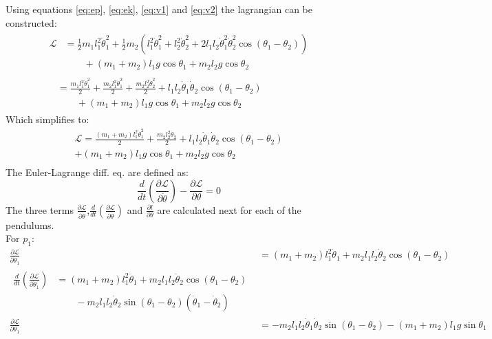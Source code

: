 Using equations \ref{eq:ep}, \ref{eq:ek}, \ref{eq:v1} and \ref{eq:v2} the lagrangian can be constructed:
\begin{align}
	\begin{split}
		\mathcal{L}&=\frac{1}{2}m_1l_1^2\dot\theta_1^2+\frac{1}{2}m_2\left(l_1^2\dot\theta_1^2+l_2^2\dot\theta_2^2+2l_1l_2\dot\theta_1^2\dot\theta_2^2\cos{(\theta_1-\theta_2)}\right)\\
		&\qquad+(m_1+m_2)l_1g\cos{\theta_1}+m_2l_2g\cos{\theta_2}
	\end{split}\\
	\begin{split}
		&=\frac{m_1l_1^2\dot\theta_1^2}{2}+\frac{m_2l_1^2\dot\theta_1^2}{2}+\frac{m_2l_2^2\dot\theta_2^2}{2}+l_1l_2\dot\theta_1\dot\theta_2\cos{(\theta_1-\theta_2)}\\
		&\qquad+(m_1+m_2)l_1g\cos{\theta_1}+m_2l_2g\cos{\theta_2}
	\end{split}
\end{align}
Which simplifies to:
\begin{equation}
	\label{eq:lagrangian}
	\begin{split}
		\mathcal{L}=\frac{(m_1+m_2)l_1^2\dot\theta_1^2}{2}+\frac{m_2l_2^2\dot\theta_2}{2}+l_1l_2\dot\theta_1\dot\theta_2\cos{(\theta_1-\theta_2)}\\
		+(m_1+m_2)l_1g\cos{\theta_1}+m_2l_2g\cos{\theta_2}\\
	\end{split}
\end{equation}
The Euler-Lagrange diff. eq. are defined as:
\begin{equation}
	\frac{d}{dt}\left(\frac{\partial \mathcal{L}}{\partial \dot\theta}\right)-\frac{\partial \mathcal{L}}{\partial \theta} = 0
\end{equation}
The three terms $\frac{\partial \mathcal{L}}{\partial \dot\theta}$,$\frac{d}{dt}\left(\frac{\partial \mathcal{L}}{\partial \dot\theta}\right)$ and $\frac{\partial l}{\partial \theta}$ are calculated next for each of the pendulums. 
\\For $p_1$:
\begin{align}
	\frac{\partial \mathcal{L}}{\partial \dot\theta_1}&=(m_1+m_2)l_1^2\dot\theta_1+m_2l_1l_2\dot\theta_2\cos{(\theta_1-\theta_2)}\\
	\begin{split}
		\frac{d}{dt}\left(\frac{\partial \mathcal{L}}{\partial \dot\theta_1}\right)&=(m_1+m_2)l_1^2\ddot\theta_1+m_2l_1l_2\ddot\theta_2\cos{(\theta_1-\theta_2)}\\
		&\qquad-m_2l_1l_2\dot\theta_2\sin{(\theta_1-\theta_2)(\dot\theta_1-\dot\theta_2)}
	\end{split}\\
	\frac{\partial \mathcal{L}}{\partial \theta_1} &= -m_2l_1l_2\dot\theta_1\dot\theta_2\sin(\theta_1-\theta_2)-(m_1+m_2)l_1g\sin{\theta_1}\\
\end{align}
